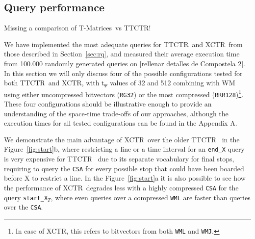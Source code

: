 \documentclass[runningheads]{llncs}
\newcommand{\acumm}{T-Matrices} %
\newcommand{\ctr}{XCTR}
\newcommand{\ttctr}{TTCTR}
\begin{document}
\subsection{Query performance}
\label{sec:time}
Missing a comparison of \acumm~vs \ttctr!

We have implemented the most adequate queries for \ttctr~and \ctr~from those described in Section~\ref{sec:rq}, and measured their average execution time from 100.000 randomly generated queries on [rellenar detalles de Compostela 2]. In this section we will only discuss four of the possible configurations tested for both \ttctr~and \ctr, with t$_{\Psi}$ values of 32 and 512 combining with WM using either uncompressed bitvectors (\texttt{RG32}) or the most compressed (\texttt{RRR128})\footnote{In case of \ctr, this refers to bitvectors from both \texttt{WML} and \texttt{WMJ}.}. These four configurations should be illustrative enough to provide an understanding of the space-time trade-offs of our approaches, although the execution times for all tested configurations can be found in the Appendix A.

We demonstrate the main advantage of \ctr~over the older \ttctr~ in the Figure~\ref{fig:start}b, where restricting a line or a time interval for an \texttt{end\_X} query is very expensive for \ttctr~ due to its separate vocabulary for final stops, requiring to query the \texttt{CSA} for every possible stop that could have been boarded before X to restrict a line. In the Figure~\ref{fig:start}a it is also possible to see how the performance of \ctr~degrades less with a highly compressed \texttt{CSA} for the query \texttt{start\_X$_T$}, where even queries over a compressed \texttt{WML} are faster than queries over the \texttt{CSA}.

\end{document}
